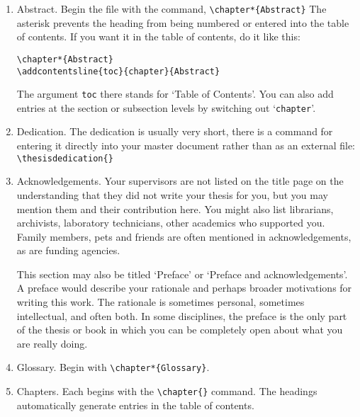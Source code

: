 \begin{enumerate}
\item Abstract. Begin the file with the command, \verb+\chapter*{Abstract}+ The asterisk prevents the heading from being numbered or entered into the table of contents. If you want it in the table of contents, do it like this:

\noindent
\verb+\chapter*{Abstract}+ \\
\verb+\addcontentsline{toc}{chapter}{Abstract}+

The argument \verb+toc+ there stands for `Table of Contents'. You can also add entries at the section or subsection levels by switching out `\verb+chapter+'.

\item Dedication. The dedication is usually very short, there is a command for entering it directly into your master document rather than as an external file: \verb+\thesisdedication{}+

\item Acknowledgements. Your supervisors are not listed on the title page on the understanding that they did not write your thesis for you, but you may mention them and their contribution here. You might also list librarians, archivists, laboratory technicians, other academics who supported you. Family members, pets and friends are often mentioned in acknowledgements, as are funding agencies.

This section may also be titled `Preface' or `Preface and acknowledgements'. A preface would describe your rationale and perhaps broader motivations for writing this work. The rationale is sometimes personal, sometimes intellectual, and often both. In some disciplines, the preface is the only part of the thesis or book in which you can be completely open about what you are really doing.

\item Glossary. Begin with \verb+\chapter*{Glossary}+.

\item Chapters. Each begins with the \verb+\chapter{}+ command. The headings automatically generate entries in the table of contents. 


\end{enumerate}
